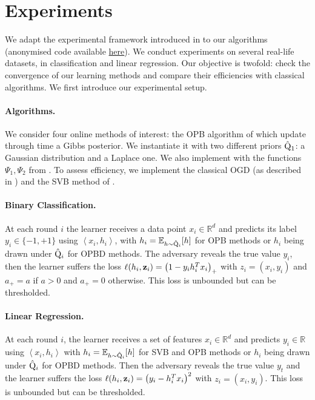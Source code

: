 \section{Experiments}
\label{sec: experiments}

We adapt the experimental framework introduced in \citet[Sec.5]{cherief2019generalization} to our algorithms (anonymised code available \href{https://anonymous.4open.science/r/Online-PAC-Bayes-learning-044F}{here}). We conduct experiments on several real-life datasets, in classification and
linear regression. Our objective is twofold: check the convergence of our learning methods and compare their efficiencies with classical algorithms. We first introduce our experimental setup.

\paragraph{Algorithms.}
We consider four online methods of interest: the OPB algorithm of  which update through time a Gibbs posterior. We instantiate it with two different priors $\hat{\mathrm{Q}}_1$: a Gaussian distribution and a Laplace one. We also implement  with the functions $\Psi_1,\Psi_2$ from .
To assess efficiency, we implement the classical OGD (as described in \citealp[Alg. 1 of][]{zinkevich2003online}) and the SVB method of \citet{cherief2019generalization}.

\paragraph{Binary Classification.} At each round $i$ the learner receives a data point $x_{i} \in \mathbb{R}^{d}$ and predicts its label $y_{i} \in\{-1,+1\}$ using $\left\langle x_{i}, h_{i}\right\rangle$, with $h_i= \mathbb{E}_{h\sim \hat{\mathrm{Q}}_i}[h]$ for OPB methods or $h_i$ being drawn under $\hat{\mathrm{Q}}_i$ for OPBD methods.
The adversary reveals the true value $y_{i}$, then the learner suffers the loss $\ell(h_i,\mathbf{z}_i)=\left(1-y_{i} h_{i}^{T} x_{i}\right)_{+}$ with $z_i=(x_i,y_i)$ and $a_{+}=a$ if $a>0$ and $a_{+}=0$ otherwise. This loss is unbounded but can be thresholded.


\paragraph{Linear Regression.} At each round $i$, the learner receives a set of features $x_{i} \in \mathbb{R}^{d}$ and predicts $y_{i} \in \mathbb{R}$ using $\left\langle x_{i}, h_{i}\right\rangle$ with $h_i= \mathbb{E}_{h\sim \hat{\mathrm{Q}}_i}[h]$ for SVB and OPB methods or $h_i$ being drawn under $\hat{\mathrm{Q}}_i$ for OPBD methods.
Then the adversary reveals the true value $y_{t}$ and the learner suffers the loss $\ell(h_i,\mathbf{z}_i)=\left(y_{i}-h_{i}^{T} x_{i}\right)^{2}$ with $z_i=(x_i,y_i)$. This loss is unbounded but can be thresholded.

